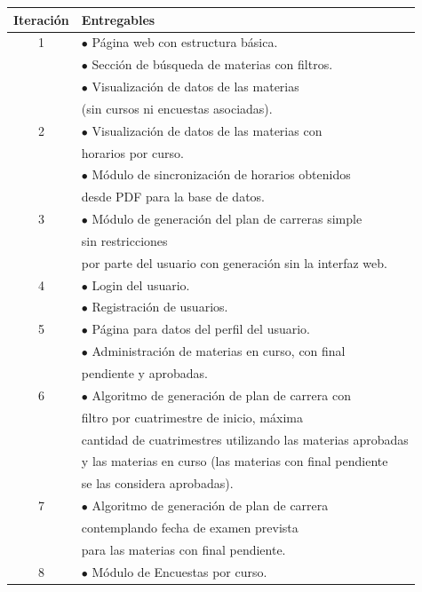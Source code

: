 \documentclass[a4paper]{article}
\begin{document}
\begin{table}[htbp]
\begin{center}
\begin{tabular}{|c|l|}
\hline
\textbf{Iteración}	 & 		\textbf{Entregables}\\

\hline
1 	& $\bullet$ Página web con estructura básica.\\
  	& $\bullet$ Sección de búsqueda de materias con filtros.\\
  	& $\bullet$ Visualización de datos de las materias\\
  	& (sin cursos ni encuestas asociadas).\\
\hline
2 	& $\bullet$ Visualización de datos de las materias con\\
	& horarios por curso.\\
  	& $\bullet$ Módulo de sincronización de horarios obtenidos\\
  	& desde PDF para la base de datos.\\
\hline
3 	& $\bullet$ Módulo de generación del plan de carreras simple\\
	& sin restricciones\\
	& por parte del usuario con generación sin la interfaz web.\\
\hline
4 	& $\bullet$ Login del usuario.\\
  	& $\bullet$ Registración de usuarios.\\
\hline
5 	& $\bullet$ Página para datos del perfil del usuario.\\
  	& $\bullet$ Administración de materias en curso, con final\\
  	& pendiente y aprobadas.\\
\hline
6 	& $\bullet$ Algoritmo de generación de plan de carrera con\\
	& filtro por cuatrimestre de inicio, máxima\\
  	& cantidad de cuatrimestres utilizando las materias aprobadas\\
  	& y las materias en curso (las materias con final pendiente\\
  	& se las considera aprobadas).\\
\hline
7 	& $\bullet$ Algoritmo de generación de plan de carrera\\
	& contemplando fecha de examen prevista\\
	& para las materias con final pendiente.\\
\hline
8 	& $\bullet$ Módulo de Encuestas por curso.\\

\end{tabular}
\end{center}
\end{table}
\end{document}
